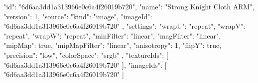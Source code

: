 {
  "id": "6d6aa3dd1a313966e0c6a4f26019b720",
  "name": "Strong Knight Cloth ARM",
  "version": 1,
  "source": {
    "kind": "image",
    "imageId": "6d6aa3dd1a313966e0c6a4f26019b720"
  },
  "settings": {
    "wrapU": "repeat",
    "wrapV": "repeat",
    "wrapW": "repeat",
    "minFilter": "linear",
    "magFilter": "linear",
    "mipMap": true,
    "mipMapFilter": "linear",
    "anisotropy": 1,
    "flipY": true,
    "precision": "low",
    "colorSpace": "srgb"
  },
  "textureIds": [
    "6d6aa3dd1a313966e0c6a4f26019b720"
  ],
  "imageIds": [
    "6d6aa3dd1a313966e0c6a4f26019b720"
  ]
}
